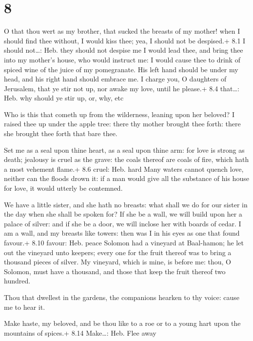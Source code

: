 \hypertarget{section-7}{%
\section{8}\label{section-7}}

 O that thou wert as my brother, that sucked the breasts of
my mother! when I should find thee without, I would kiss thee; yea, I
should not be despised.+ 8.1 I should not\ldots: Heb. they should not
despise me  I would lead thee, and bring thee into my
mother's house, who would instruct me: I would cause thee to drink of
spiced wine of the juice of my pomegranate.  His left hand
should be under my head, and his right hand should embrace me.
 I charge you, O daughters of Jerusalem, that ye stir not
up, nor awake my love, until he please.+ 8.4 that\ldots: Heb. why should
ye stir up, or, why, etc

 Who is this that cometh up from the wilderness, leaning
upon her beloved? I raised thee up under the apple tree: there thy
mother brought thee forth: there she brought thee forth that bare thee.

 Set me as a seal upon thine heart, as a seal upon thine
arm: for love is strong as death; jealousy is cruel as the grave: the
coals thereof are coals of fire, which hath a most vehement flame.+ 8.6
cruel: Heb. hard  Many waters cannot quench love, neither
can the floods drown it: if a man would give all the substance of his
house for love, it would utterly be contemned.

 We have a little sister, and she hath no breasts: what
shall we do for our sister in the day when she shall be spoken for?
 If she be a wall, we will build upon her a palace of
silver: and if she be a door, we will inclose her with boards of cedar.
 I am a wall, and my breasts like towers: then was I in his
eyes as one that found favour.+ 8.10 favour: Heb. peace 
Solomon had a vineyard at Baal-hamon; he let out the vineyard unto
keepers; every one for the fruit thereof was to bring a thousand pieces
of silver.  My vineyard, which is mine, is before me: thou,
O Solomon, must have a thousand, and those that keep the fruit thereof
two hundred.

 Thou that dwellest in the gardens, the companions hearken
to thy voice: cause me to hear it.

 Make haste, my beloved, and be thou like to a roe or to
a young hart upon the mountains of spices.+ 8.14 Make\ldots: Heb. Flee
away
